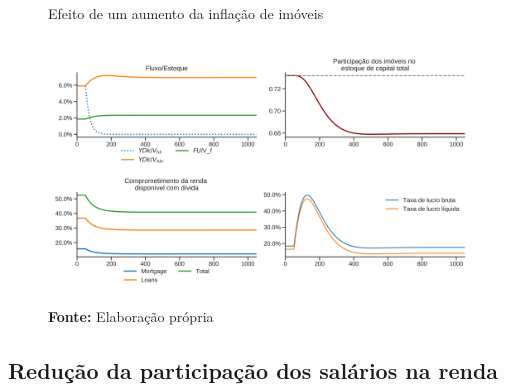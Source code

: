 \begin{figure}[H]
	\centering
	\caption{Efeito de um aumento da inflação de imóveis}
	\label{choque_4Norms}
	\includegraphics[width=\textwidth]{../../Modelo/Versoes/Shock_4Norms.png}
	\caption*{\textbf{Fonte:} Elaboração própria}
\end{figure}


\subsection*{Redução da participação dos salários na renda}

